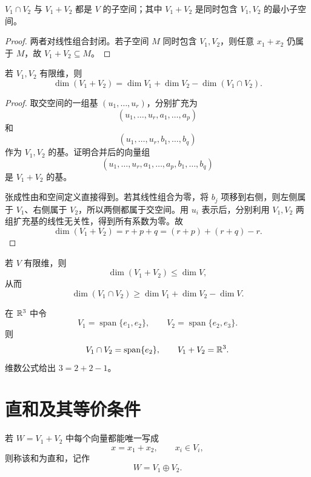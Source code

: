 \begin{proposition}
$V_1\cap V_2$ 与 $V_1+V_2$ 都是 $V$ 的子空间；其中 $V_1+V_2$ 是同时包含 $V_1,V_2$ 的最小子空间。
\end{proposition}
\begin{proof}
两者对线性组合封闭。若子空间 $M$ 同时包含 $V_1,V_2$，则任意 $x_1+x_2$ 仍属于 $M$，故 $V_1+V_2\subseteq M$。
\end{proof}

\begin{theorem}[子空间维数公式]
若 $V_1,V_2$ 有限维，则
\[
\dim(V_1+V_2)
=\dim V_1+\dim V_2-\dim(V_1\cap V_2).
\]
\end{theorem}
\begin{proof}
取交空间的一组基 $(u_1,\ldots,u_r)$，分别扩充为
\[
(u_1,\ldots,u_r,a_1,\ldots,a_p)
\]
和
\[
(u_1,\ldots,u_r,b_1,\ldots,b_q)
\]
作为 $V_1,V_2$ 的基。证明合并后的向量组
\[
(u_1,\ldots,u_r,a_1,\ldots,a_p,b_1,\ldots,b_q)
\]
是 $V_1+V_2$ 的基。

张成性由和空间定义直接得到。若其线性组合为零，将 $b_j$ 项移到右侧，则左侧属于 $V_1$、右侧属于 $V_2$，所以两侧都属于交空间。用 $u_i$ 表示后，分别利用 $V_1,V_2$ 两组扩充基的线性无关性，得到所有系数为零。故
\[
\dim(V_1+V_2)=r+p+q
=(r+p)+(r+q)-r.
\]
\end{proof}

\begin{corollary}
若 $V$ 有限维，则
\[
\dim(V_1+V_2)\le\dim V,
\]
从而
\[
\dim(V_1\cap V_2)\ge
\dim V_1+\dim V_2-\dim V.
\]
\end{corollary}

\begin{example}[title={两个平面的和与交}]
在 $\mathbb{R}^3$ 中令
\[
V_1=\operatorname{span}\{e_1,e_2\},\qquad
V_2=\operatorname{span}\{e_2,e_3\}.
\]
则
\[
V_1\cap V_2=\operatorname{span}\{e_2\},\qquad
V_1+V_2=\mathbb{R}^3.
\]
维数公式给出 $3=2+2-1$。
\end{example}

\section{直和及其等价条件}

\begin{definition}[两个子空间的直和]
若 $W=V_1+V_2$ 中每个向量都能唯一写成
\[
x=x_1+x_2,\qquad x_i\in V_i,
\]
则称该和为直和，记作
\[
W=V_1\oplus V_2.
\]
\end{definition}

